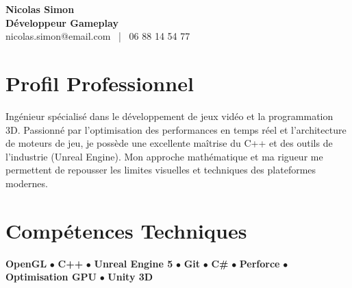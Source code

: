 \documentclass[11pt,a4paper]{article}
\begin{document}
\begin{center}
    {\Huge \textbf{Nicolas Simon}} \\[0.2cm]
    {\Large \textbf{Développeur Gameplay}} \\[0.1cm]
    nicolas.simon@email.com \ | \ 06 88 14 54 77
\end{center}

\vspace{0.3cm}

\section*{Profil Professionnel}
\noindent
Ingénieur spécialisé dans le développement de jeux vidéo et la programmation 3D. Passionné par l'optimisation des performances en temps réel et l'architecture de moteurs de jeu, je possède une excellente maîtrise du C++ et des outils de l'industrie (Unreal Engine). Mon approche mathématique et ma rigueur me permettent de repousser les limites visuelles et techniques des plateformes modernes.

\vspace{0.3cm}

\section*{Compétences Techniques}
\noindent
\textbf{OpenGL} $\bullet$ \textbf{C++} $\bullet$ \textbf{Unreal Engine 5} $\bullet$ \textbf{Git} $\bullet$ \textbf{C\#} $\bullet$ \textbf{Perforce} $\bullet$ \textbf{Optimisation GPU} $\bullet$ \textbf{Unity 3D}

\vspace{0.3cm}

\end{document}

